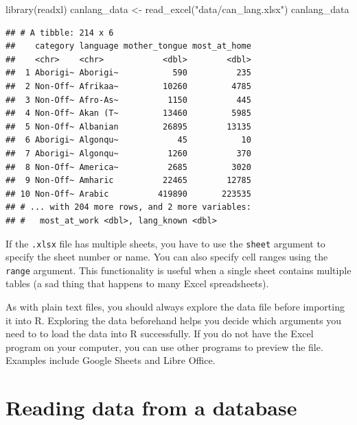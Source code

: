 \documentclass[
]{krantz}
\makeatletter
\newenvironment{Shaded}{\begin{snugshade}}{\end{snugshade}}
\newcommand{\FunctionTok}[1]{\textcolor[rgb]{0,0,0}{#1}}
\newcommand{\NormalTok}[1]{#1}
\newcommand{\OtherTok}[1]{\textcolor[rgb]{0.37,0.37,0.37}{#1}}
\newcommand{\StringTok}[1]{\textcolor[rgb]{0.5,0.5,0.5}{#1}}
\newenvironment{kframe}{%
\medskip{}
\setlength{\fboxsep}{.8em}
 \def\at@end@of@kframe{}%
 \ifinner\ifhmode%
  \def\at@end@of@kframe{\end{minipage}}%
  \begin{minipage}{\columnwidth}%
 \fi\fi%
 \def\FrameCommand##1{\hskip\@totalleftmargin \hskip-\fboxsep
 \colorbox{shadecolor}{##1}\hskip-\fboxsep
     \hskip-\linewidth \hskip-\@totalleftmargin \hskip\columnwidth}%
 \MakeFramed {\advance\hsize-\width
   \@totalleftmargin\z@ \linewidth\hsize
   \@setminipage}}%
 {\par\unskip\endMakeFramed%
 \at@end@of@kframe}
\renewenvironment{Shaded}{\begin{kframe}}{\end{kframe}}
\makeatother
\begin{document}
\begin{Shaded}
\begin{Highlighting}[]
\FunctionTok{library}\NormalTok{(readxl)}
\NormalTok{canlang\_data }\OtherTok{\textless{}{-}} \FunctionTok{read\_excel}\NormalTok{(}\StringTok{"data/can\_lang.xlsx"}\NormalTok{)}
\NormalTok{canlang\_data}
\end{Highlighting}
\end{Shaded}

\begin{verbatim}
## # A tibble: 214 x 6
##    category language mother_tongue most_at_home
##    <chr>    <chr>            <dbl>        <dbl>
##  1 Aborigi~ Aborigi~           590          235
##  2 Non-Off~ Afrikaa~         10260         4785
##  3 Non-Off~ Afro-As~          1150          445
##  4 Non-Off~ Akan (T~         13460         5985
##  5 Non-Off~ Albanian         26895        13135
##  6 Aborigi~ Algonqu~            45           10
##  7 Aborigi~ Algonqu~          1260          370
##  8 Non-Off~ America~          2685         3020
##  9 Non-Off~ Amharic          22465        12785
## 10 Non-Off~ Arabic          419890       223535
## # ... with 204 more rows, and 2 more variables:
## #   most_at_work <dbl>, lang_known <dbl>
\end{verbatim}

If the \texttt{.xlsx} file has multiple sheets, you have to use the \texttt{sheet} argument to specify the sheet number or name. You can also specify cell ranges using the \texttt{range} argument. This functionality is useful when a single sheet contains multiple tables (a sad thing that happens to many Excel spreadsheets).

As with plain text files, you should always explore the data file before importing it into R. Exploring the data beforehand helps you decide which arguments you need to to load the data into R successfully. If you do not have the Excel program on your computer, you can use other programs to preview the file. Examples include Google Sheets and Libre Office.

\hypertarget{reading-data-from-a-database}{%
\section{Reading data from a database}\label{reading-data-from-a-database}}
\end{document}
